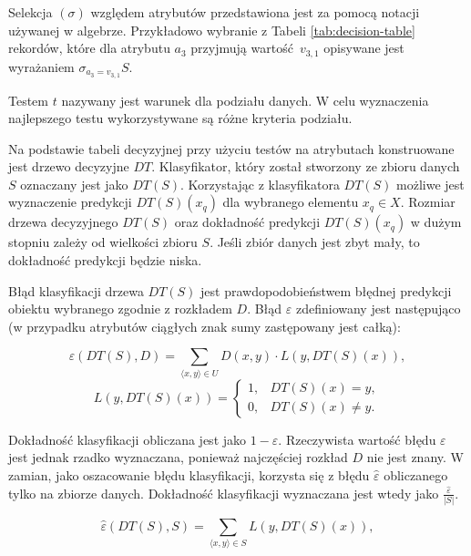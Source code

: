 \documentclass[12pt]{article}
\begin{document}
Selekcja $(\sigma)$ względem atrybutów przedstawiona jest za pomocą notacji używanej w algebrze.
Przykładowo wybranie z Tabeli \ref{tab:decision-table} rekordów, które dla atrybutu $a_3$ przyjmują
wartość~$v_{3,1}$ opisywane jest wyrażaniem $\sigma_{a_3=v_{3,1}}S$.

Testem $t$ nazywany jest warunek dla podziału danych. W celu wyznaczenia najlepszego testu wykorzystywane
są różne kryteria podziału.

Na podstawie tabeli decyzyjnej przy użyciu testów na atrybutach konstruowane jest drzewo decyzyjne $DT$.
Klasyfikator, który został stworzony ze zbioru danych $S$ oznaczany jest jako $DT(S)$. Korzystając z klasyfikatora
$DT(S)$ możliwe jest wyznaczenie predykcji $DT(S)(x_q)$ dla wybranego elementu $x_q \in X$. Rozmiar drzewa decyzyjnego $DT(S)$ oraz dokładność predykcji $DT(S)(x_q)$
w dużym stopniu zależy od wielkości zbioru $S$. Jeśli zbiór danych jest zbyt mały, to dokładność predykcji będzie niska.

Błąd klasyfikacji drzewa $DT(S)$ jest prawdopodobieństwem błędnej predykcji obiektu wybranego zgodnie z rozkładem $D$.
Błąd $\varepsilon$ zdefiniowany jest następująco (w przypadku atrybutów ciągłych znak sumy zastępowany jest całką):

\begin{equation}
    \varepsilon(DT(S), D) = \displaystyle\sum_{\langle x, y\rangle \in U} D(x, y) \cdot L(y, DT(S)(x)),
\end{equation}
\begin{equation}
    L(y, DT(S)(x)) = \left\{
        \begin{array}{ll}
            1, & DT(S)(x) = y, \\
            0, & DT(S)(x) \neq y.
        \end{array} \right.
\end{equation}

\vspace{0.8cm}

Dokładność klasyfikacji obliczana jest jako $1 - \varepsilon$.
Rzeczywista wartość błędu $\varepsilon$ jest jednak rzadko wyznaczana, ponieważ najczęściej rozkład $D$ nie jest znany.
W zamian, jako oszacowanie błędu klasyfikacji, korzysta się z błędu $\hat{\varepsilon}$
obliczanego tylko na zbiorze danych. Dokładność klasyfikacji wyznaczana jest wtedy jako $\frac{\hat{\varepsilon}}{|S|}$.

\begin{equation}
    \hat{\varepsilon}(DT(S), S) = \displaystyle\sum_{\langle x, y\rangle \in S} L(y, DT(S)(x)),
\end{equation}
\end{document}
